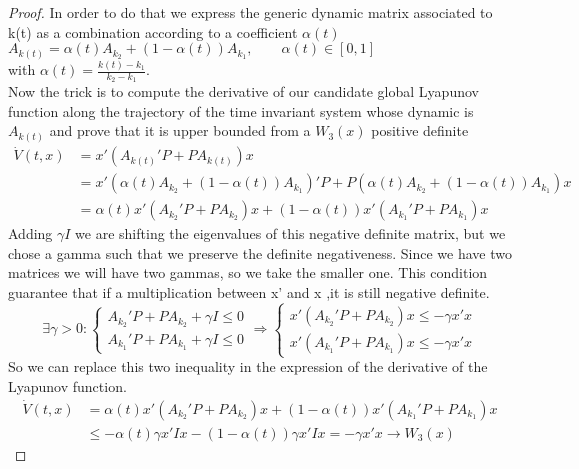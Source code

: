 \begin{proof}
	In order to do that we express the generic dynamic matrix associated to k(t) as a combination according to a coefficient $\alpha(t)$\\
	$A_{k(t)}=\alpha(t)A_{k_2}+(1-\alpha(t))A_{k_1}, \qquad \alpha(t)\in [0,1]$ \\
	with $\alpha(t)=\frac{k(t)-k_1}{k_2-k_1}$.\\
Now the trick is to compute the derivative of our candidate global Lyapunov function along the trajectory of the time invariant system whose dynamic is $A_{k(t)}$ and prove that it is upper bounded from a $W_3(x)$ positive definite
\begin{align*}
	\dot{V}(t,x)&=x'(A_{k(t)}'P+PA_{k(t)})x \\
	&= x'(\alpha(t)A_{k_2}+(1-\alpha(t))A_{k_1})'P+P(\alpha(t)A_{k_2}+(1-\alpha(t))A_{k_1})x\\ &=\alpha(t)x'(A_{k_2}'P+PA_{k_2})x+(1-\alpha(t))x'(A_{k_1}'P+PA_{k_1})x
\end{align*}
Adding $\gamma I$ we are shifting the eigenvalues of this negative definite matrix, but we chose a gamma such that we preserve the definite negativeness. Since we have two matrices we will have two gammas, so we take the smaller one. This condition guarantee that if a multiplication between x' and x ,it is still negative definite.
\[
\exists\gamma>0\colon \begin{cases}
	A_{k_2}'P+PA_{k_2}+\gamma I \le0\\
A_{k_1}'P+PA_{k_1}+\gamma I \le0
\end{cases}\Rightarrow \begin{cases}
x'(A_{k_2}'P+PA_{k_2})x\le -\gamma x'x\\
x'(A_{k_1}'P+PA_{k_1})x\le -\gamma x'x
\end{cases}
\]
So we can replace this two inequality in the expression of the derivative of the Lyapunov function.
\begin{align*}
	\dot{V}(t,x)&=\alpha(t)x'(A_{k_2}'P+PA_{k_2})x+(1-\alpha(t))x'(A_{k_1}'P+PA_{k_1})x\\
	&\le -\alpha(t)\gamma x'Ix-(1-\alpha(t))\gamma x'Ix = -\boxed{\gamma x'x}\longrightarrow W_3(x)
\end{align*}
\end{proof}
